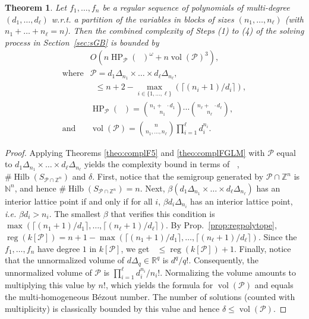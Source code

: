\documentclass[12pt]{article}
\numberwithin{equation}{section}
\newtheorem{theorem}{Theorem}
\numberwithin{theorem}{section}
\newcommand{\Z}{\mathbb{Z}}
\DeclareMathOperator{\vol}{vol}
\DeclareMathOperator{\HP}{HP}
\DeclareMathOperator{\hilbert}{Hilb}
\newcommand{\polytope}{\mathscr P}
\DeclareMathOperator{\reg}{reg}
\DeclareMathOperator{\dwit}{d_{wit}}
\newcommand{\R}{\mathbb{R}}
\newcommand{\N}{\mathbb{N}}
\begin{document}
\begin{theorem}\label{theo:multihom}
Let $f_1,\ldots, f_n$ be a regular sequence of polynomials of multi-degree $(d_1,\ldots, d_\ell)$ w.r.t. a partition of the variables in blocks of sizes $(n_1,\ldots, n_\ell)$ (with $n_1+\dots+n_\ell=n$). Then the combined complexity of Steps (1) to (4) of the solving process in Section~\ref{sec:sGB} is bounded by
$$\begin{array}{rl}
&O\left(n \HP_\polytope(\dwit)^\omega + n\vol(\polytope)^3\right),\\
\text{where}&\polytope=d_1\Delta_{n_1}\times\dots\times d_\ell\Delta_{n_\ell},\\
&\dwit\leq n+2-\max_{i\in\{1,\ldots,\ell\}}(\lceil (n_i+1)/d_i\rceil),\\
&\HP_\polytope(\dwit)=\binom{n_1+\dwit\cdot d_1}{n_1}\cdots\binom{n_\ell+\dwit\cdot d_\ell}{n_\ell},\\
\text{and}&\vol(\polytope)=\binom{n}{n_1,\ldots,n_\ell}\prod_{i=1}^\ell d_i^{n_i}.
\end{array}$$
\end{theorem}

\begin{proof}
Applying Theorems \ref{theo:complF5} and
\ref{theo:complFGLM} with $\polytope$ equal to $d_1\Delta_{n_1}\times\dots\times
d_\ell\Delta_{n_\ell}$ yields the complexity bound in terms of $\dwit$,
$\#\hilbert(S_{\polytope\cap\Z^n})$ and $\delta$.
First, notice that the semigroup generated by $\polytope\cap\Z^n$ is $\N^n$, and hence $\#\hilbert(S_{\polytope\cap\Z^n})=n$.
Next,  $\beta(d_1\Delta_{n_1}\times\dots\times d_\ell\Delta_{n_\ell})$
has an interior lattice point if and only if for all $i$, $\beta
d_i\Delta_{n_i}$ has an interior
lattice point, \emph{i.e.} $\beta d_i > n_i$. The smallest $\beta$ that verifies this condition is
$\max(\lceil (n_1+1)/d_1\rceil,\ldots,\lceil
(n_\ell+1)/d_\ell\rceil)$. By Prop.~\ref{prop:regpolytope}, $\reg(k[\polytope])=n+1-\max(\lceil
(n_1+1)/d_1\rceil,\ldots,\lceil (n_\ell+1)/d_\ell\rceil)$. Since the
$f_1,\ldots, f_n$ have degree $1$ in $k[\polytope]$, we get
$\dwit\leq \reg(k[\polytope])+1$.
Finally, notice that the unnormalized volume of $d
\Delta_q\in\R^q$ is $d^q/q!$. Consequently, the
unnormalized volume of $\polytope$ is $\prod_{i=1}^\ell
d_i^{n_i}/{n_i}!$. Normalizing the volume amounts to multiplying this
value by $n!$, which yields the formula for $\vol(\polytope)$ and equals the multi-homogeneous B\'ezout number. The number of solutions (counted with multiplicity) is classically bounded by this value and hence $\delta\leq \vol(\polytope)$.
\end{proof}
\end{document}
